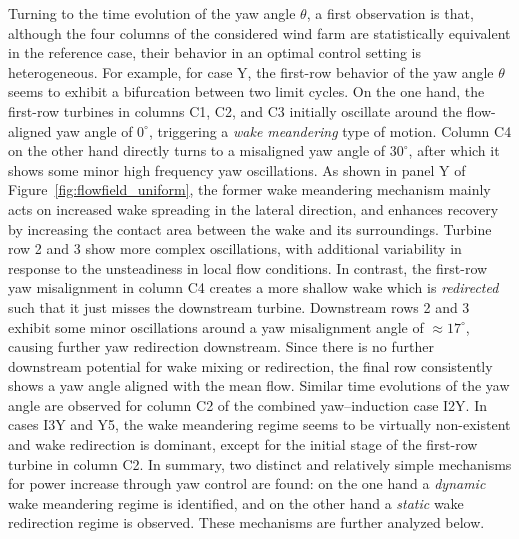 \documentclass[energies,article,submit,moreauthors,latex,10pt,a4paper]{mdpi}
\begin{document}
Turning to the time evolution of the yaw angle $\theta$, a first observation is that, although the four columns of the considered wind farm are statistically equivalent in the reference case, their behavior in an optimal control setting is heterogeneous. For example, for case Y, the first-row behavior of the yaw angle $\theta$ seems to exhibit a bifurcation between two limit cycles. On the one hand, the first-row turbines in columns C1, C2, and C3 initially oscillate around the flow-aligned yaw angle of $0^\circ$, triggering a \emph{wake meandering} type of motion. Column C4 on the other hand directly turns to a misaligned yaw angle of $30^\circ$, after which it shows some minor high frequency yaw oscillations. As shown in panel Y of Figure~\ref{fig:flowfield_uniform}, the former wake meandering mechanism mainly acts on increased wake spreading in the lateral direction, and enhances recovery by increasing the contact area between the wake and its surroundings. Turbine row 2 and 3 show more complex oscillations, with additional variability in response to the unsteadiness in local flow conditions. In contrast, the first-row yaw misalignment in column C4 creates a more shallow wake which is \emph{redirected} such that it just misses the downstream turbine. Downstream rows 2 and 3 exhibit some minor oscillations around a yaw misalignment angle of $\approx 17^\circ$, causing further yaw redirection downstream. Since there is no further downstream potential for wake mixing or redirection, the final row consistently shows a yaw angle aligned with the mean flow. Similar time evolutions of the yaw angle are observed for column C2 of the combined yaw--induction case I2Y. In cases I3Y and Y5, the wake meandering regime seems to be virtually non-existent and wake redirection is dominant, except for the initial stage of the first-row turbine in column C2. In summary, two distinct and relatively simple mechanisms for power increase through yaw control are found: on the one hand a \emph{dynamic} wake meandering regime is identified, and on the other hand a \emph{static} wake redirection regime is observed. These mechanisms are further analyzed below.
\end{document}
